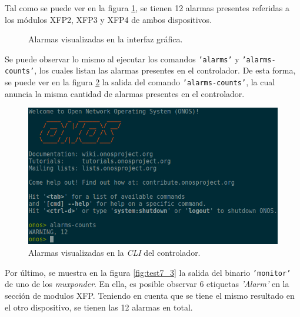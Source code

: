   Tal como se puede ver en la figura \ref{fig:test7_1}, se tienen 12 alarmas presentes referidas a los módulos XFP2, XFP3 y XFP4 de ambos dispositivos.

  \begin{figure}[H]
	\centering
	\caption{Alarmas visualizadas en la interfaz gráfica.}
	\label{fig:test7_1}
  \end{figure}

  Se puede observar lo mismo al ejecutar los comandos \texttt{'alarms'} y \texttt{'alarms-counts'}, los cuales listan las alarmas presentes en el controlador. De esta forma, se puede ver en la figura \ref{fig:test7_2} la salida del comando \texttt{'alarms-counts'}, la cual anuncia la misma cantidad de alarmas presentes en el controlador.

  \begin{figure}[H]
	\centering
	\includegraphics[scale=0.5]{Figures/test7_2.png}
	\caption{Alarmas visualizadas en la \textit{CLI} del controlador.}
	\label{fig:test7_2}
  \end{figure}

  Por último, se muestra en la figura \ref{fig:test7_3} la salida del binario \texttt{'monitor'} de uno de los \textit{muxponder}. En ella, es posible observar 6 etiquetas \textit{'Alarm'} en la sección de modulos XFP. Teniendo en cuenta que se tiene el mismo resultado en el otro dispositivo, se tienen las 12 alarmas en total.

